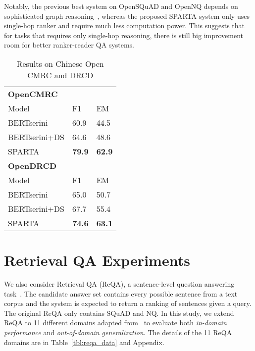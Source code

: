 \documentclass[11pt,a4paper]{article}
\begin{document}
Notably, the previous best system on OpenSQuAD and OpenNQ depends on sophisticated graph reasoning~\cite{asai2019learning}, whereas the proposed SPARTA system only uses single-hop ranker and require much less computation power. This suggests that for tasks that requires only single-hop reasoning, there is still big improvement room for better ranker-reader QA systems.



\begin{table}[]
\centering
\begin{tabular}{p{}p{}p{}} 
\hline
\textbf{OpenCMRC} &  &  \\ 
Model & F1 & EM \\ \hline
BERTserini\cite{xie2020distant} & 60.9 & 44.5 \\
BERTserini+DS \cite{xie2020distant} & 64.6 & 48.6 \\

\hline
SPARTA & \textbf{79.9} & \textbf{62.9} \\

\Xhline{3\arrayrulewidth}

\textbf{OpenDRCD} &  &  \\ 
Model & F1 & EM \\ \hline
BERTserini \cite{xie2020distant} & 65.0 & 50.7 \\
BERTserini+DS \cite{xie2020distant} & 67.7 & 55.4 \\
\hline
SPARTA & \textbf{74.6} & \textbf{63.1} \\
\hline

\end{tabular}
\caption{Results on Chinese Open CMRC and DRCD}
\label{tbl:openqa-zh}
\end{table}




 
\section{Retrieval QA Experiments}
We also consider Retrieval QA (ReQA), a sentence-level question answering task~\cite{ahmad2019reqa}. The candidate answer set contains every possible sentence from a text corpus and the system is expected to return a ranking of sentences given a query. The original ReQA only contains SQuAD and NQ. In this study, we extend ReQA to 11 different domains adapted from~\cite{fisch2019mrqa} to evaluate both \textit{in-domain performance} and \textit{out-of-domain generalization}. The details of the 11 ReQA domains are in Table~\ref{tbl:reqa_data} and Appendix.
\end{document}
